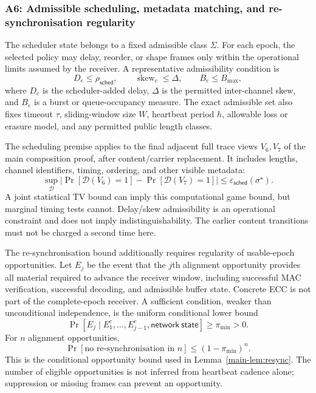 \documentclass[journal]{IEEEtran}
\theoremstyle{definition}
\theoremstyle{game}
\begin{document}
\subsubsection{A6: Admissible scheduling, metadata matching, and re-synchronisation regularity}
\label{supp-assump:a6}

The scheduler state belongs to a fixed admissible class
$\Sigma$. For each epoch, the selected policy may delay, reorder,
or shape frames only within the operational limits assumed by the
receiver. A representative admissibility condition is
\begin{equation}
D_e\leq \rho_{\mathsf{sched}},
\qquad
\operatorname{skew}_e\leq\Delta,
\qquad
B_e\leq B_{\max},
\label{supp-eq:scheduler-budget}
\end{equation}
where $D_e$ is the scheduler-added delay, $\Delta$ is the permitted
inter-channel skew, and $B_e$ is a burst or queue-occupancy measure.
The exact admissible set also fixes timeout $\tau$, sliding-window
size $W$, heartbeat period $h$, allowable loss or erasure model,
and any permitted public length classes.

The scheduling premise applies to the final adjacent full trace views
$V_6,V_7$ of the main composition proof, after content/carrier replacement.
It includes lengths, channel identifiers, timing, ordering, and other
visible metadata:
\begin{equation}\label{supp-eq:scheduler-tv}
\sup_{\mathcal D}\left|\Pr[\mathcal D(V_6)=1]-\Pr[\mathcal D(V_7)=1]\right|
\le\varepsilon_{\mathsf{sched}}(\sigma^\star).
\end{equation}
A joint statistical TV bound can imply this computational game bound,
but marginal timing tests cannot. Delay/skew admissibility is an
operational constraint and does not imply indistinguishability.
The earlier content transitions must not be charged a second time here.

The re-synchronisation bound additionally requires regularity of
usable-epoch opportunities. Let $E_j$ be the event that the
$j$th alignment opportunity provides all material required to
advance the receiver window, including successful MAC
verification, successful decoding, and admissible buffer state. Concrete
ECC is not part of the complete-epoch receiver. A sufficient
condition, weaker than unconditional independence, is the uniform
conditional lower bound
\begin{equation}
\Pr[E_j\mid E_1^{c},\ldots,E_{j-1}^{c},
\mathsf{network\ state}]
\geq \pi_{\min}>0.
\label{supp-eq:conditional-resync}
\end{equation}
For $n$ alignment opportunities,
\begin{equation}
\Pr[\text{no re-synchronisation in }n]
\leq (1-\pi_{\min})^{n}.
\label{supp-eq:resync-bound}
\end{equation}
This is the conditional opportunity bound used in
Lemma~\ref{main-lem:resync}. The number of eligible opportunities is not
inferred from heartbeat cadence alone; suppression or missing frames can
prevent an opportunity.
\end{document}
